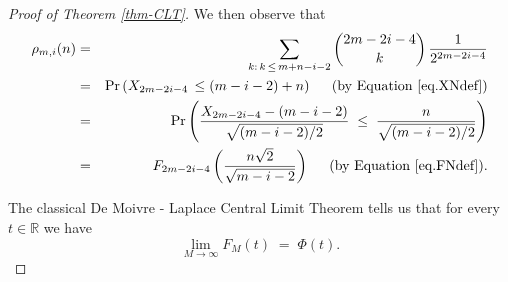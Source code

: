 \documentclass[11pt]{amsart}
\theoremstyle{definition}
\theoremstyle{remark}
\numberwithin{equation}{section}
\begin{document}
\begin{proof}[Proof of Theorem \ref{thm-CLT}]
We then observe that 
\begin{eqnarray*}
    \rho_{m,i}(n)   & = &  \sum_{k:\,k\,\leq\, m+n-i-2}  \binom{2m-2i-4}{k} \, \frac{1}{2^{2m-2i-4}}
    \\
    & = &   \Pr\left(X_{2m-2i-4}\,\leq  (m-i-2)+n\right)   \hspace{5mm}\mbox{(by Equation \eqref{eq.XNdef})}
    \\
      & = &   \Pr\left(   \frac{X_{2m-2i-4}-(m-i-2)}{\sqrt{(m-i-2)/2}} \; \leq \;  \frac{n}{\sqrt{(m-i-2)/2}}\right)
      \\
      & = & F_{2m-2i-4}\left(  \frac{n\sqrt{2}}{\sqrt{m-i-2}}\right)    \hspace{5mm}\mbox{(by Equation \eqref{eq.FNdef})}.
\end{eqnarray*}

The classical De Moivre - Laplace Central Limit Theorem tells us that for every $t\in\mathbb{R}$ we have
\begin{equation}
   \label{eq.binCLT}
      \lim_{M\rightarrow\infty}F_M(t) \;=\; \Phi(t).
\end{equation}


\end{proof}
\end{document}

